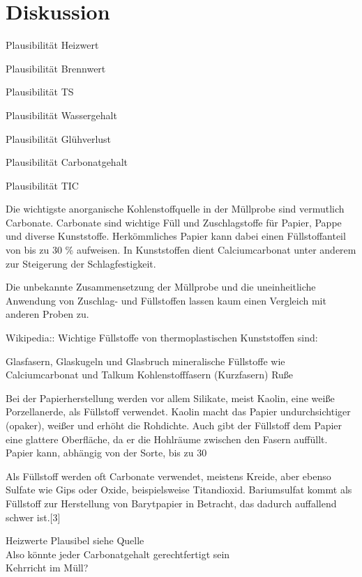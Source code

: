 \chapter{Diskussion}
\label{sec:diskussion}

Plausibilität Heizwert

Plausibilität Brennwert

Plausibilität TS

Plausibilität Wassergehalt

Plausibilität Glühverlust

Plausibilität Carbonatgehalt

Plausibilität TIC


Die wichtigste anorganische Kohlenstoffquelle in der Müllprobe sind vermutlich Carbonate.
Carbonate sind wichtige Füll und Zuschlagstoffe für Papier, Pappe und diverse Kunststoffe. Herkömmliches Papier kann dabei einen Füllstoffanteil von bis zu 30 \% aufweisen. In Kunststoffen dient Calciumcarbonat unter anderem zur Steigerung der Schlagfestigkeit. 

Die unbekannte Zusammensetzung der Müllprobe und die uneinheitliche Anwendung von Zuschlag- und Füllstoffen lassen kaum einen Vergleich mit anderen Proben zu. 



Wikipedia::
Wichtige Füllstoffe von thermoplastischen Kunststoffen sind:

Glasfasern, Glaskugeln und Glasbruch
mineralische Füllstoffe wie Calciumcarbonat und Talkum
Kohlenstofffasern (Kurzfasern)
Ruße

Bei der Papierherstellung werden vor allem Silikate, meist Kaolin, eine weiße Porzellanerde, als Füllstoff verwendet. Kaolin macht das Papier undurchsichtiger (opaker), weißer und erhöht die Rohdichte. Auch gibt der Füllstoff dem Papier eine glattere Oberfläche, da er die Hohlräume zwischen den Fasern auffüllt. Papier kann, abhängig von der Sorte, bis zu 30 %

Als Füllstoff werden oft Carbonate verwendet, meistens Kreide, aber ebenso Sulfate wie Gips oder Oxide, beispielsweise Titandioxid. Bariumsulfat kommt als Füllstoff zur Herstellung von Barytpapier in Betracht, das dadurch auffallend schwer ist.[3] 

Heizwerte Plausibel siehe Quelle\\

Also könnte jeder Carbonatgehalt gerechtfertigt sein\\

Kehrricht im Müll?

